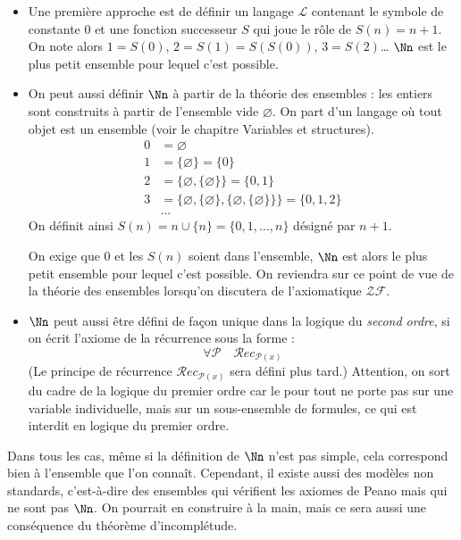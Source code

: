 \documentclass[11pt,class=report,crop=false]{standalone}
\begin{document}
\begin{itemize}
	\item Une première approche est de définir un langage $\mathcal{L}$ contenant le symbole de constante $0$ et une fonction \og{}successeur\fg{} $S$ qui joue le rôle de $S(n) = n+1$. On note alors $1 = S(0)$, $2 = S(1) = S(S(0)) $, $3 = S(2)$\ldots{} 
	$\Nn$ est le plus petit ensemble pour lequel c'est possible.
	
	\item On peut aussi définir $\Nn$ à partir de la théorie des ensembles : les entiers sont construits à partir de l'ensemble vide $\varnothing$. On part d'un langage où tout objet est un ensemble (voir le chapitre \og{}Variables et structures\fg{}).
	\begin{align*}
		0 &= \varnothing \\
		1 &= \{\varnothing\} = \{0\} \\
		2 &= \{\varnothing, \{\varnothing\}\} = \{0, 1\} \\
		3 &= \{\varnothing, \{\varnothing\}, \{\varnothing, \{\varnothing\}\}\} = \{0, 1, 2\} \\
		&\dots
	\end{align*}
	On définit ainsi $S(n) = n \cup \{n\} = \{0, 1, \ldots, n\}$ désigné par $n+1$. 
	
	On exige que $0$ et les $S(n)$ soient dans l'ensemble, $\Nn$ est alors le plus petit ensemble pour lequel c'est possible. On reviendra sur ce point de vue de la théorie des ensembles lorsqu'on discutera de l'axiomatique $\mathcal{ZF}$.
	
	\item $\Nn$ peut aussi être défini de façon unique dans la logique du \emph{second ordre}, si on écrit l'axiome de la récurrence sous la forme :
	\[
	\forall \mathcal{P} \quad \mathcal{R}ec_{\mathcal{P}(x)}
	\]
	(Le principe de récurrence $\mathcal{R}ec_{\mathcal{P}(x)}$ sera défini plus tard.) 
	Attention, on sort du cadre de la logique du premier ordre car le \og{}pour tout\fg{} ne porte pas sur une variable individuelle, mais sur un sous-ensemble de formules, ce qui est interdit en logique du premier ordre.
\end{itemize}


Dans tous les cas, même si la définition de $\Nn$ n'est pas simple, cela correspond bien à l'ensemble que l'on connaît. Cependant, il existe aussi des modèles non standards, c'est-à-dire des ensembles qui vérifient les axiomes de Peano mais qui ne sont pas $\Nn$. On pourrait en construire à la main, mais ce sera aussi une conséquence du théorème d'incomplétude.
\end{document}
